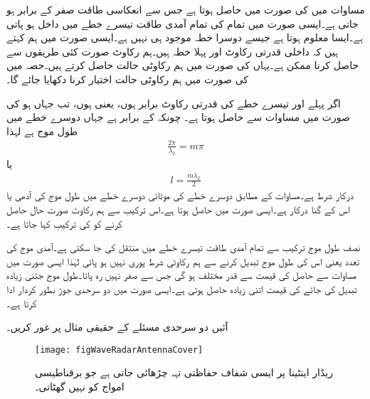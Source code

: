 مساوات  میں  کی صورت میں  حاصل  ہوتا ہے جس سے انعکاسی طاقت صفر کے برابر ہو جاتی ہے۔ایسی صورت میں تمام کی تمام آمدی طاقت تیسرے خطے میں داخل ہو پاتی ہے۔ایسا معلوم ہوتا ہے جیسے دوسرا خطہ موجود ہی نہیں ہے۔ایسی صورت میں ہم کہتے ہیں کہ داخلی قدرتی رکاوٹ اور پہلا خطہ  ہیں۔ہم رکاوٹ صورت کئی طریقوں سے حاصل کرنا ممکن ہے۔یہاں  کی صورت میں ہم رکاوٹی حالت حاصل کرتے ہیں۔حصہ  میں  کی صورت میں ہم رکاوٹی حالت اختیار کرنا دکھایا جائے گا۔

اگر پہلے اور تیسرے خطے کی قدرتی رکاوٹ برابر ہوں، یعنی  ہوں، تب  جہاں  ہو کی صورت میں مساوات  سے   حاصل ہوتا ہے۔ چونکہ  کے برابر ہے جہاں  دوسرے خطے میں طول موج ہے لہٰذا
\begin{align*}
\frac{2 \pi}{\lambda_2}=m \pi
\end{align*}
یا
\begin{align}\label{مساوات_مستوی_دو_سرحدی_ہم_رکاوٹ_شرط}
l=\frac{m \lambda_2}{2}
\end{align}
درکار شرط ہے۔مساوات  کے مطابق دوسرے خطے کی موٹائی دوسرے خطے میں طول موج کی آدھی یا اس کے  گنا درکار ہے۔ایسی صورت میں  حاصل ہوتا ہے۔اس ترکیب سے ہم رکاوٹ صورت حال حاصل کرنے کو  کی ترکیب کہا جاتا ہے۔

نصف طول موج ترکیب سے تمام آمدی طاقت تیسرے خطے میں منتقل کی جا سکتی ہے۔آمدی موج کی تعدد یعنی اس کی طول موج تبدیل کرنے سے ہم رکاوٹی شرط پوری نہیں ہو پاتی لہٰذا ایسی صورت میں مساوات  سے حاصل  کی قیمت  سے قدر مختلف ہو گی جس سے  صفر نہیں رہ پاتا۔طول موج جتنی زیادہ تبدیل کی جائے  کی قیمت اتنی زیادہ حاصل ہوتی ہے۔ایسی صورت میں دو سرحدی جوڑ بطور  کردار ادا کرتا ہے۔

آئیں دو سرحدی مسئلے کے حقیقی مثال پر غور کریں۔

\begin{figure}
\centering
\texttt{[image: figWaveRadarAntennaCover]}
\caption{ریڈار اینٹینا پر ایسی شفاف حفاظتی تہہ چڑھائی جاتی ہے جو برقناطیسی امواج کو نہیں گھٹاتی۔}
\label{شکل_موج_ریڈار_اینٹینا_تہہ}
\end{figure}

